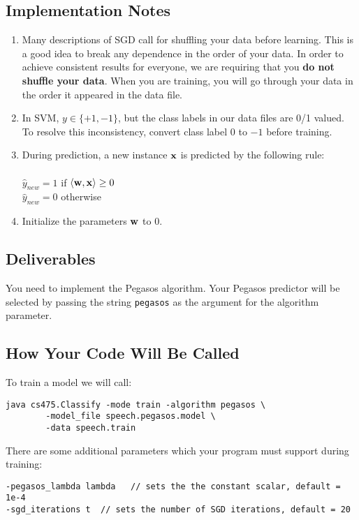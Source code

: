 \documentclass[11pt]{article}
\newcommand{\vw}{{\bf w}}
\newcommand{\vx}{{\bf x}}
\newcommand{\code}[1]{{\footnotesize \tt #1}}
\begin{document}
\subsection{Implementation Notes}
\begin{enumerate}[1.]
\item Many descriptions of SGD call for shuffling your data before learning. This is a good idea to break any dependence in the order of your data. In order to achieve consistent results for everyone, we are requiring that you \textbf{do not shuffle your data}. When you are training, you will go through your data in the order it appeared in the data file.

\item In SVM, $y \in \{+1,-1\}$, but the class labels in our data files are 0/1 valued. To resolve this inconsistency, convert class label $0$ to $-1$ before training.

\item
During prediction, a new instance $\vx$ is predicted by the following rule:\\
\\
$\hat{y}_{new} = 1$ if $\langle\vw, \vx\rangle \ge 0$\\
$\hat{y}_{new} = 0$ otherwise\\

\item
Initialize the parameters $\vw$ to $0$.

\end{enumerate}

\subsection{Deliverables}
You need to implement the Pegasos algorithm. Your Pegasos predictor will be selected by passing the string \code{pegasos} as the argument for the algorithm parameter.

\subsection{How Your Code Will Be Called}

To train a model we will call:
\begin{verbatim}
java cs475.Classify -mode train -algorithm pegasos \
        -model_file speech.pegasos.model \
        -data speech.train
\end{verbatim}

There are some additional parameters which your program must support during training:
\begin{verbatim}
-pegasos_lambda	lambda   // sets the the constant scalar, default = 1e-4
-sgd_iterations t  // sets the number of SGD iterations, default = 20
\end{verbatim}
\end{document}
